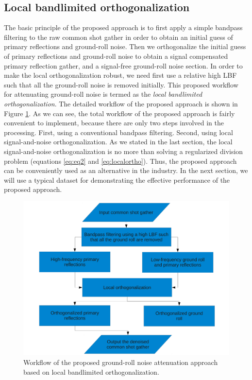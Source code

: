 \subsection{Local bandlimited orthogonalization}
The basic principle of the proposed approach is to first apply a simple bandpass filtering to the raw common shot gather in order to obtain an initial guess of primary reflections and ground-roll noise. Then we orthogonalize the initial guess of primary reflections and ground-roll noise to obtain a signal compensated primary reflection gather, and a signal-free ground-roll noise section. In order to make the local orthogonalization robust, we need first use a relative high LBF such that all the ground-roll noise is removed initially. This proposed workflow for attenuating ground-roll noise is termed as the \emph{local bandlimited orthogonalization}. The detailed workflow of the proposed approach is shown in Figure \ref{fig:flowchart}. As we can see, the total workflow of the proposed approach is fairly convenient to implement, because there are only two steps involved in the processing. First, using a conventional bandpass filtering. Second, using local signal-and-noise orthogonalization. As we stated in the last section, the local signal-and-noise orthogonalization is no more than solving a regularized division problem (equations \ref{eq:eq2} and \ref{eq:localortho}). Thus, the proposed approach can be conveniently used as an alternative in the industry. In the next section, we will use a typical dataset for demonstrating the effective performance of the proposed approach.
\begin{figure}[htb!]
  \centering
    \includegraphics[width=0.8\columnwidth]{Fig/flowchart}
	\caption{Workflow of the proposed ground-roll noise attenuation approach based on local bandlimited orthogonalization.}
   \label{fig:flowchart}
\end{figure}
